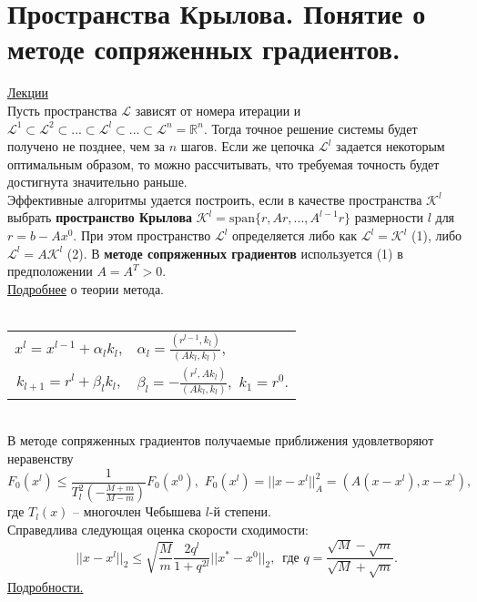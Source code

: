 \documentclass[specialist, subf, href, colorlinks=true, 12pt, times, mtpro, final]{disser}
\theoremstyle{definition}
\def\mcL{\mathcal{L}}
\def\mcK{\mathcal{K}}
\begin{document}
\section {Пространства Крылова. Понятие о методе сопряженных градиентов.}
	\hyperlink {lects.74}{Лекции}\\
	Пусть пространства $\mcL$ зависят от номера итерации и $\mcL^1 \subset \mcL^2 \subset
	... \subset \mcL^l \subset ... \subset \mcL^n = \mathds{R}^n$. Тогда точное решение
	системы будет получено не позднее, чем за $n$ шагов. Если же цепочка $\mcL^l$ задается
	некоторым оптимальным образом, то можно рассчитывать, что требуемая точность будет
	достигнута значительно раньше.\\
	Эффективные алгоритмы удается построить, если в качестве пространства $\mcK^l$ выбрать
	{\bf пространство Крылова} $\mcK^l = \text{span}\{r, Ar, ..., A^{l-1}r\}$ размерности
	$l$ для $r = b - Ax^0$. При этом пространство $\mcL^l$ определяется либо как
	$\mcL^l = \mcK^l$ (1), либо $\mcL^l = A\mcK^l$ (2). В {\bf методе сопряженных
	градиентов} используется (1) в предположении $A = A^T > 0$.\\
	\hyperlink {lects.75}{Подробнее} о теории метода.\\
	\\
	\begin{tabular}{cl}
	    $x^l = x^{l-1} + \alpha_l k_l$, & $\alpha_l = \frac{(r^{l-1},k_l)}{(Ak_l,k_l)}$,\\
	    $k_{l+1} = r^l + \beta_l k_l$,  & $\beta_l = -\frac{(r^l,Ak_l)}{(Ak_l,k_l)},
	    \,\,k_1 = r^0.$
    \end{tabular}\\
    В методе сопряженных градиентов получаемые приближения удовлетворяют неравенству
    $$
        F_0(x^l)\le\frac{1}{T_l^2\left(-\frac{M+m}{M-m}\right)}F_0(x^0),\,\,
        F_0(x^l) = ||x-x^l||_A^2 = (A(x-x^l),x-x^l),
    $$
    где $T_l(x)$ -- многочлен Чебышева $l$-й степени.\\
    Справедлива следующая оценка скорости сходимости:
    $$
        ||x-x^l||_2 \le \sqrt{\frac{M}{m}}\frac{2q^l}{1+q^{2l}}||x^*-x^0||_2,\,\,\,
        \text{где } q = \frac{\sqrt{M}-\sqrt{m}}{\sqrt{M}+\sqrt{m}}.
    $$
    \hyperlink {lects.76}{Подробности.}
\end{document}
